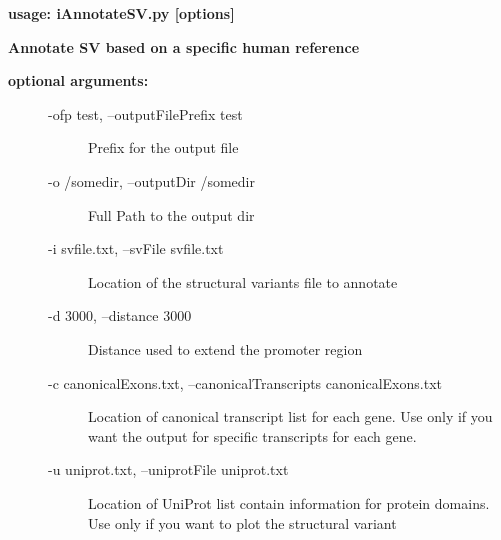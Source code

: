 \documentclass[letterpaper,10pt,english]{sphinxmanual}
\begin{document}
\textbf{usage: iAnnotateSV.py {[}options{]}}

\textbf{Annotate SV based on a specific human reference}
\begin{description}
\item[{\textbf{optional arguments:}}] \leavevmode{}
\begin{description}
\item[{-ofp test, --outputFilePrefix test}] \leavevmode
Prefix for the output file

\item[{-o /somedir, --outputDir /somedir}] \leavevmode
Full Path to the output dir

\item[{-i svfile.txt, --svFile svfile.txt}] \leavevmode
Location of the structural variants file to annotate

\item[{-d 3000, --distance 3000}] \leavevmode
Distance used to extend the promoter region

\end{description}
\begin{description}
\item[{-c canonicalExons.txt, --canonicalTranscripts canonicalExons.txt}] \leavevmode
Location of canonical transcript list for each gene.
Use only if you want the output for specific
transcripts for each gene.

\end{description}
\begin{description}
\item[{-u uniprot.txt, --uniprotFile uniprot.txt}] \leavevmode
Location of UniProt list contain information for
protein domains. Use only if you want to plot the
structural variant


\end{description}
\end{description}
\end{document}
